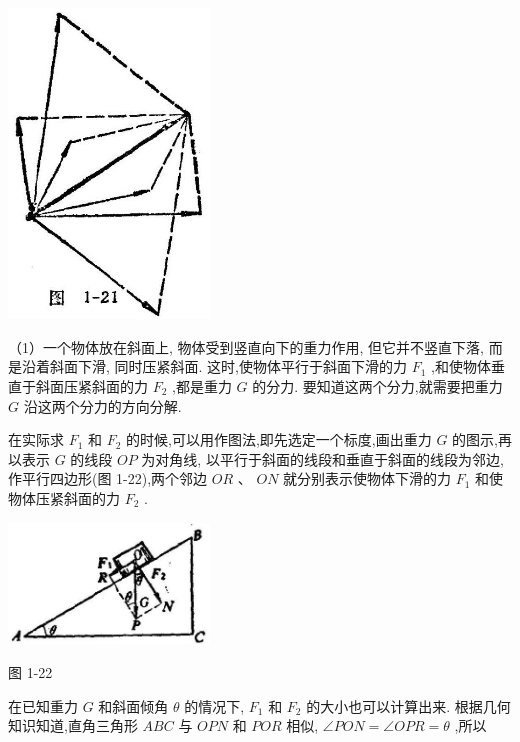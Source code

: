 \documentclass[10pt]{article}
\begin{document}
\begin{center}
\includegraphics[max width=0.4\textwidth]{images/01912d55-147c-70aa-b0e0-1782a122f948_34_621679.jpg}
\end{center}

（1）一个物体放在斜面上, 物体受到竖直向下的重力作用, 但它并不竖直下落, 而是沿着斜面下滑, 同时压紧斜面. 这时,使物体平行于斜面下滑的力 \({F}_{1}\) ,和使物体垂直于斜面压紧斜面的力 \({F}_{2}\) ,都是重力 \(G\) 的分力. 要知道这两个分力,就需要把重力 \(G\) 沿这两个分力的方向分解.

在实际求 \({F}_{1}\) 和 \({F}_{2}\) 的时候,可以用作图法,即先选定一个标度,画出重力 \(G\) 的图示,再以表示 \(G\) 的线段 \({OP}\) 为对角线, 以平行于斜面的线段和垂直于斜面的线段为邻边, 作平行四边形(图 1-22),两个邻边 \({OR}\) 、 \({ON}\) 就分别表示使物体下滑的力 \({F}_{1}\) 和使物体压紧斜面的力 \({F}_{2}\) .

\begin{center}
\includegraphics[max width=0.4\textwidth]{images/01912d55-147c-70aa-b0e0-1782a122f948_35_545044.jpg}
\end{center}

图 1-22

在已知重力 \(G\) 和斜面倾角 \(\theta\) 的情况下, \({F}_{1}\) 和 \({F}_{2}\) 的大小也可以计算出来. 根据几何知识知道,直角三角形 \({ABC}\) 与 \({OPN}\) 和 \({POR}\) 相似, \(\angle {PON} = \angle {OPR} = \theta\) ,所以
\end{document}
